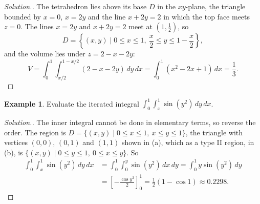 \documentclass[11pt,a4paper]{article}
\theoremstyle{definition}
\newtheorem{exa}[thm]{Example}
\newenvironment{solution}
  {\renewcommand{\qedsymbol}{}\begin{proof}[\textit{Solution}.]}
  {\end{proof}}
\begin{document}
\begin{solution}
The tetrahedron lies above its base $D$ in the $xy$-plane, the triangle bounded
by $x = 0$, $x = 2y$ and the line $x + 2y = 2$ in which the top face meets
$z = 0$. The lines $x = 2y$ and $x + 2y = 2$ meet at $\left(1,\frac12\right)$,
so
\[D = \left\{(x,y) \mid 0\leq x\leq 1,\ \frac{x}{2}\leq y \leq 1 -
\frac{x}{2}\right\},\]
and the volume lies under $z = 2 - x - 2y$:
\[V = \int^1_0\int^{1 -x/2}_{x/2} ( 2 - x -2y)\,dy\,dx = \int^1_0(x^2 - 2x +
1)\,dx = \frac{1}{3} .\]
\end{solution}

\begin{exa}
\label{ex:reverseorder}
Evaluate the iterated integral $\int^1_0\int^1_{x}\sin (y^2)\,dy\,dx$.

\begin{figure}[H]
\centering
{}
\end{figure}
\end{exa}

\begin{solution}
The inner integral cannot be done in elementary terms, so reverse the order. The
region is $D = \{(x,y)\mid 0\leq x\leq 1,\ x\leq y\leq 1\}$, the triangle with
vertices $(0,0)$, $(0,1)$ and $(1,1)$ shown in (a), which as a type II region,
in (b), is $\{(x,y)\mid 0\leq y\leq 1,\ 0\leq x\leq y\}$. So
\begin{align*}
\int^1_0\int^1_{x}\sin (y^2)\,dy\,dx & = \int^1_0\int^y_{0}\sin (y^2)\,dx\,dy =
\int^1_0y\sin (y^2)\,dy\\
& = \left[-\frac{\cos y^2}{2}\right]_0^1 = \frac{1}{2}(1 - \cos 1)\approx 0.2298 .
\end{align*}
\end{solution}
\end{document}
